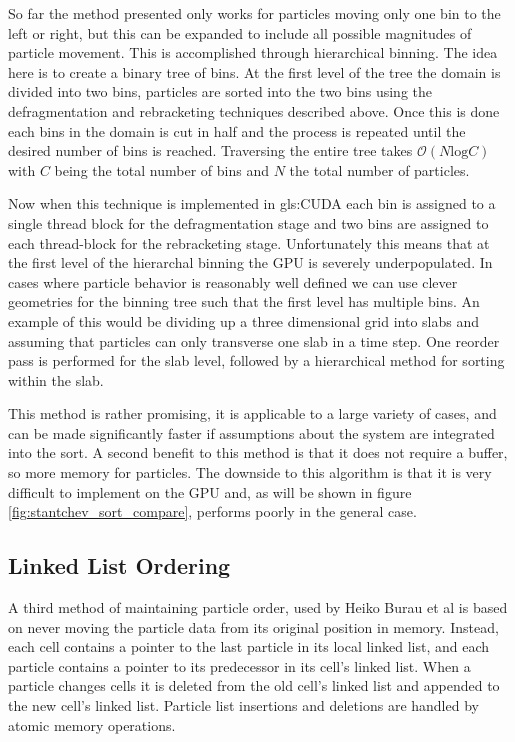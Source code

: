 	So far the method presented only works for particles moving only one bin to the left or right, but this can be expanded to include all possible magnitudes of particle movement. This is accomplished through hierarchical binning. The idea here is to create a binary tree of bins. At the first level of the tree the domain is divided into two bins, particles are sorted into the two bins using the defragmentation and rebracketing techniques described above. Once this is done each bins in the domain is cut in half and the process is repeated until the desired number of bins is reached. Traversing the entire tree takes $\mathcal{O}(N \mathrm{log} C)$ with $C$ being the total number of bins and $N$ the total number of particles. \cite{Stantchev2008}

Now when this technique is implemented in \gls{gls:CUDA} each bin is assigned to a single thread block for the defragmentation stage and two bins are assigned to each thread-block for the rebracketing stage.  Unfortunately this means that at the first level of the hierarchal binning the GPU is severely underpopulated. In cases where particle behavior is reasonably well defined we can use clever geometries for the binning tree such that the first level has multiple bins. An example of this would be dividing up a three dimensional grid into slabs and assuming that particles can only transverse one slab in a time step. One reorder pass is performed for the slab level, followed by a hierarchical method for sorting within the slab. 

This method is rather promising, it is applicable to a large variety of cases, and can be made significantly faster if assumptions about the system are integrated into the sort. A second benefit to this method is that it does not require a buffer, so more memory for particles. The downside to this algorithm is that it is very difficult to implement on the GPU and, as will be shown in figure \ref{fig:stantchev_sort_compare}, performs poorly in the general case. 


	\subsection{Linked List Ordering}
	A third method of maintaining particle order, used by Heiko Burau et al is based on never moving the particle data from its original position in memory. Instead, each cell contains a pointer to the last particle in its local linked list, and each particle contains a pointer to its predecessor in its cell's linked list. When a particle changes cells it is deleted from the old cell's linked list and appended to the new cell's linked list. Particle list insertions and deletions are handled by atomic memory operations. \cite{Burau2010}

